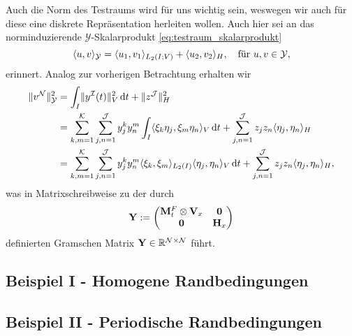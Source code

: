 \documentclass[../main.tex]{subfiles}
\begin{document}
Auch die Norm des Testraums wird für uns wichtig sein, weswegen wir auch für diese eine diskrete Repräsentation herleiten wollen.
Auch hier sei an das norminduzierende $\mathcal Y$-Skalarprodukt \cref{eq:testraum_skalarprodukt}
\begin{equation}
    \langle u,v\rangle_{\mathcal Y} = \langle u_{1},v_{1}\rangle_{L_2(I; V)} + \langle u_{2},v_{2}\rangle_{H}, \quad \text{für } u, v \in \mathcal Y,
\end{equation}
erinnert.
Analog zur vorherigen Betrachtung erhalten wir
\begin{align}
    \lVert v^{\mathcal N}\rVert_{\mathcal Y}^{2}
    &= \int_{I} \lVert y^{\mathcal I}(t)\rVert_{V}^{2} \mathop{}\!\mathrm{d} t + \lVert z^{\mathcal J}\rVert_{H}^{2}
    \\&= \sum_{k,m = 1}^{\mathcal K} \sum_{j, n = 1}^{\mathcal J} y^{k}_{j} y^{m}_{n} \int_{I} \langle\xi_{k} \eta_{j},\xi_{m} \eta_{n}\rangle_{V} \mathop{}\!\mathrm{d} t + \sum_{j, n = 1}^{\mathcal J} z_{j} z_{n} \langle\eta_{j},\eta_{n}\rangle_{H}
    \\&= \sum_{k,m = 1}^{\mathcal K} \sum_{j, n = 1}^{\mathcal J} y^{k}_{j} y^{m}_{n} \langle\xi_{k},\xi_{m}\rangle_{L_{2}(I)} \langle\eta_{j},\eta_{n}\rangle_{V} \mathop{}\!\mathrm{d} t + \sum_{j, n = 1}^{\mathcal J} z_{j} z_{n} \langle\eta_{j},\eta_{n}\rangle_{H},
\end{align}
was in Matrixschreibweise zu der durch
\begin{equation}
    \mathbf{Y} := \begin{pmatrix}
    \mathbf{M}_{t}^{F} \otimes \mathbf{V}_{x} & \mathbf{0}\\
    \mathbf{0} & \mathbf{H}_{x}
    \end{pmatrix}
\end{equation}
definierten Gramschen Matrix $\mathbf{Y} \in \mathbb{R}^{\mathcal N \times \mathcal N}$ führt.

\subsection{Beispiel I - Homogene Randbedingungen} %
\label{sub:beispiel}


\subsection{Beispiel II - Periodische Randbedingungen} %
\label{sub:beispiel_ii_periodische_randbedingungen}

\end{document}
